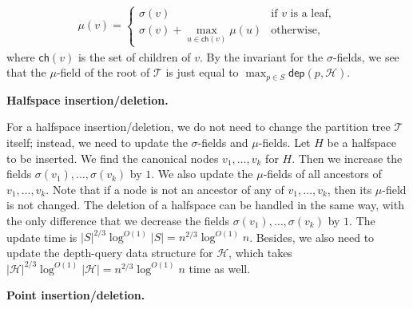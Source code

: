 \documentclass[10pt,a4paper]{article}
\begin{document}
\par
\[\begin{aligned}
\displaystyle\mu(v)=\begin{cases}\sigma(v)&\text{if }v\text{ is a leaf},\\
\sigma(v)+\max_{u\in\mathsf{ch}(v)}\mu(u)&\text{otherwise,}\end{cases}
\end{aligned}\]
where $\mathsf{ch}(v)$ is the set of children of $v$. By the invariant for the $\sigma$-fields, we see that the $\mu$-field of the root of $\mathcal{T}$ is just equal to $\max_{p\in S}{\mathsf{dep}}(p,\mathcal{H})$.
\par
\par
\par\medskip\noindent\textbf{Halfspace insertion/deletion.}\par
For a halfspace insertion/deletion, we do not need to change the partition tree $\mathcal{T}$ itself; instead, we need to update the $\sigma$-fields and $\mu$-fields. Let $H$ be a halfspace to be inserted. We find the canonical nodes $v_{1},\dots,v_{k}$ for $H$. Then we increase the fields $\sigma(v_{1}),\dots,\sigma(v_{k})$ by $1$. We also update the $\mu$-fields of all ancestors of $v_{1},\dots,v_{k}$. Note that if a node is not an ancestor of any of $v_{1},\dots,v_{k}$, then its $\mu$-field is not changed. The deletion of a halfspace can be handled in the same way, with the only difference that we decrease the fields $\sigma(v_{1}),\dots,\sigma(v_{k})$ by $1$. The update time is $|S|^{2/3}\log^{O(1)}|S|=n^{2/3}\log^{O(1)}n$. Besides, we also need to update the depth-query data structure for $\mathcal{H}$, which takes $|\mathcal{H}|^{2/3}\log^{O(1)}|\mathcal{H}|=n^{2/3}\log^{O(1)}n$ time as well.
\par
\par
\par\medskip\noindent\textbf{Point insertion/deletion.}\par
\end{document}
